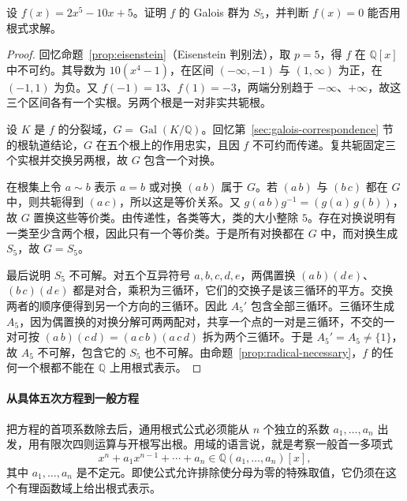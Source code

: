 \documentclass[lang=cn,a4paper,fontset=none,zihao=false,10pt,openany,twoside]{beautybook}
\numberwithin{algorithm}{chapter}
\begin{document}
\begin{example}[一个无根式解的五次方程]\label{ex:galois-quintic}
设 $f(x)=2x^5-10x+5$。证明 $f$ 的 Galois 群为 $S_5$，并判断 $f(x)=0$ 能否用根式求解。
\end{example}
\begin{proof}
回忆命题~\ref{prop:eisenstein}（Eisenstein 判别法），取 $p=5$，得 $f$ 在 $\mathbb Q[x]$ 中不可约。其导数为 $10(x^4-1)$，在区间 $(-\infty,-1)$ 与 $(1,\infty)$ 为正，在 $(-1,1)$ 为负。又 $f(-1)=13$、$f(1)=-3$，两端分别趋于 $-\infty$、$+\infty$，故这三个区间各有一个实根。另两个根是一对非实共轭根。

设 $K$ 是 $f$ 的分裂域，$G=\operatorname{Gal}(K/\mathbb Q)$。回忆第~\ref{sec:galois-correspondence} 节的根轨道结论，$G$ 在五个根上的作用忠实，且因 $f$ 不可约而传递。复共轭固定三个实根并交换另两根，故 $G$ 包含一个对换。

在根集上令 $a\sim b$ 表示 $a=b$ 或对换 $(a\,b)$ 属于 $G$。若 $(a\,b)$ 与 $(b\,c)$ 都在 $G$ 中，则共轭得到 $(a\,c)$，所以这是等价关系。又 $g(a\,b)g^{-1}=(g(a)\,g(b))$，故 $G$ 置换这些等价类。由传递性，各类等大，类的大小整除 $5$。存在对换说明有一类至少含两个根，因此只有一个等价类。于是所有对换都在 $G$ 中，而对换生成 $S_5$，故 $G=S_5$。

最后说明 $S_5$ 不可解。对五个互异符号 $a,b,c,d,e$，两偶置换 $(a\,b)(d\,e)$、$(b\,c)(d\,e)$ 都是对合，乘积为三循环，它们的交换子是该三循环的平方。交换两者的顺序便得到另一个方向的三循环。因此 $A_5'$ 包含全部三循环。三循环生成 $A_5$，因为偶置换的对换分解可两两配对，共享一个点的一对是三循环，不交的一对可按 $(a\,b)(c\,d)=(a\,c\,b)(a\,c\,d)$ 拆为两个三循环。于是 $A_5'=A_5\ne\{1\}$，故 $A_5$ 不可解，包含它的 $S_5$ 也不可解。由命题~\ref{prop:radical-necessary}，$f$ 的任何一个根都不能在 $\mathbb Q$ 上用根式表示。
\end{proof}

\paragraph{从具体五次方程到一般方程}
把方程的首项系数除去后，通用根式公式必须能从 $n$ 个独立的系数 $a_1,\dots,a_n$ 出发，用有限次四则运算与开根写出根。用域的语言说，就是考察一般首一多项式
\[
 x^n+a_1x^{n-1}+\cdots+a_n\in\mathbb Q(a_1,\dots,a_n)[x],
\]
其中 $a_1,\dots,a_n$ 是不定元。即使公式允许排除使分母为零的特殊取值，它仍须在这个有理函数域上给出根式表示。
\end{document}
